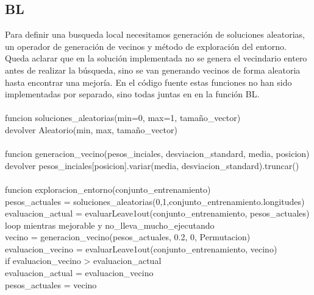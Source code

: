 \documentclass[12pt, spanish]{article}
\newcommand\tab[1][1cm]{\hspace*{#1}}
\begin{document}
\subsection{BL}
Para definir una busqueda local necesitamos generación de soluciones aleatorias, un operador de generación de vecinos y método de exploración del entorno. Queda aclarar que en la solución implementada no se genera el vecindario entero antes de realizar la búsqueda, sino se van generando vecinos de forma aleatoria hasta encontrar una mejoría. En el código fuente estas funciones no han sido implementadas por separado, sino todas juntas en en la función BL. \\
\\
funcion soluciones\_aleatorias(min=0, max=1, tamaño\_vector) { \\
\tab	devolver Aleatorio(min, max, tamaño\_vector) \\
}\\
funcion generacion\_vecino(pesos\_inciales, desviacion\_standard, media, posicion) {\\
\tab	devolver pesos\_inciales[posicion].variar(media, desviacion\_standard).truncar()\\
}\\
funcion exploracion\_entorno(conjunto\_entrenamiento) {\\
\tab	pesos\_actuales = soluciones\_aleatorias(0,1,conjunto\_entrenamiento.longitudes)\\
\tab	evaluacion\_actual = evaluarLeave1out(conjunto\_entrenamiento, pesos\_actuales)\\
\tab	loop mientras mejorable y no\_lleva\_mucho\_ejecutando{\\
\tab		vecino = generacion\_vecino(pesos\_actuales, 0.2, 0, Permutacion)\\
\tab		evaluacion\_vecino = evaluarLeave1out(conjunto\_entrenamiento, vecino) \\
\tab		if evaluacion\_vecino > evaluacion\_actual {\\
\tab\tab			evaluacion\_actual = evaluacion\_vecino\\
	\tab\tab		pesos\_actuales  = vecino \\
		}\\
	}	 \\
} \\
\end{document}
